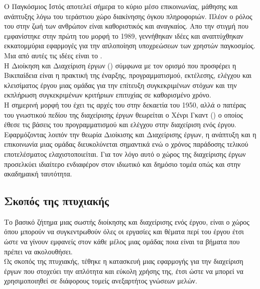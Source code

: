 \pSpace Ο Παγκόσμιος Ιστός αποτελεί σήμερα το κύριο μέσο επικοινωνίας, μάθησης και ανάπτυξης λόγω του τεράστιου χώρο διακίνησης όγκου πληροφοριών. Πλέον ο ρόλος του στην ζωή των ανθρώπον είναι καθοριστικός και αναγκαίος. Απο την στιγμή που εμφανίστηκε στην πρώτη του μορφή το 1989, γεννήθηκαν ιδέες και αναπτύχθηκαν εκκατομμύρια εφαρμογές για την απλοποίηση υποχρεώσεων των χρηστών παγκοσμίος. Μια από αυτές τις ιδέες είναι το .\\
\pSpace Η Διοίκηση και Διαχείριση έργων () σύμφωνα με τον ορισμό που προσφέρει η Βικιπαίδεια είναι η πρακτική της έναρξης, προγραμματισμού, εκτέλεσης, ελέγχου και κλεισίματος έργου μιας ομάδας για την επίτευξη συγκεκριμένων στόχων και την εκπλήρωση συγκεκριμένων κριτήριων επιτυχίας σε καθορισμένο χρόνο.\\
\pSpace Η σημερινή μορφή του  έχει τις αρχές του στην δεκαετία του 1950, αλλά ο πατέρας του γνωστικού πεδίου της διαχείρισης έργων θεωρείται ο Χένρι Γκαντ () ο οποίος έθεσε τις βάσεις του προγραμματισμού και ελέγχου στην διαχείριση ενός έργου.\\
\pSpace Εφαρμόζοντας λοιπόν την θεωρία Διοίκισης και Διαχείρισης έργων, η ανάπτυξη και η επικοινωνία μιας ομάδας διευκολύνεται σημαντικά ενώ ο χρόνος παράδοσης τελικού εποτελέσματος ελαχιστοποιείται. Για τον λόγο αυτό ο χώρος της διαχείρισης έργων προσελκύει ιδιαίτερο ενδιαφέρον στον ιδιωτικό και δημόσιο τομέα οπώς και στην ακαδημαική ταυτότητα.

\subsection*{Σκοπός της πτυχιακής}
\pSpace Το βασικό ζήτημα μιας σωστής διοίκησης και διαχείρισης ενός έργου, είναι ο χώρος όπου μπορούν να συγκεντρωθούν όλες οι εργασίες και θέματα περί του έργου έτσι ώστε να γίνουν εμφανείς στον κάθε μέλος μιας ομάδας ποια είναι τα βήματα που πρέπει να ακολουθήσει.\\
\pSpace Ως σκοπός της πτυχιακής, τέθηκε η κατασκευή μιας εφαρμογής για την διαχείριση έργων που στοχεύει την απλότητα και εύκολη χρήσης της, έτσι ώστε να μπορεί να χρησιμοποιηθεί σε διάφορους τομείς ανεξαρτήτος γνώσεων μελών.


